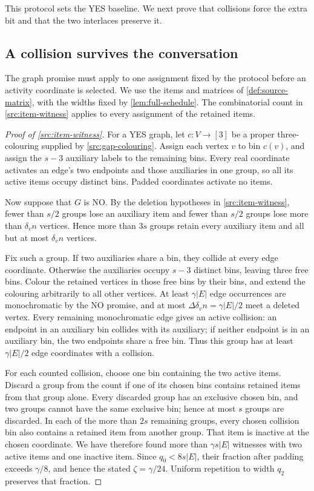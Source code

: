 \documentclass[11pt]{article} \usepackage[utf8]{inputenc}
\theoremstyle{plain} \newtheorem{theorem}{Theorem}[section]
\theoremstyle{definition} \newaliascnt{definition}{theorem}
\begin{document}
This protocol sets the YES baseline. We next prove that collisions force the
extra bit and that the two interlaces preserve it.

\subsection{A collision survives the conversation}

The graph promise must apply to one assignment fixed by the protocol before an
activity coordinate is selected. We use the items and matrices of
\cref{def:source-matrix}, with the widths fixed by \cref{lem:full-schedule}. The
combinatorial count in \cref{src:item-witness} applies to every assignment of
the retained items.

\begin{proof}[Proof of \cref{src:item-witness}]
For a YES graph, let \(c:V\to[3]\) be a proper three-colouring supplied by
\cref{src:gap-colouring}. Assign each vertex \(v\) to bin \(c(v)\), and assign
the \(s-3\) auxiliary labels to the remaining bins. Every real coordinate
activates an edge's two endpoints and those auxiliaries in one group, so all
its active items occupy distinct bins. Padded coordinates activate no items.

Now suppose that \(G\) is NO. By the deletion hypotheses in
\cref{src:item-witness}, fewer than \(s/2\) groups lose an auxiliary item and
fewer than \(s/2\) groups lose more than \(\delta_v n\) vertices. Hence more
than \(3s\) groups retain every auxiliary item and all but at most \(\delta_v
n\) vertices.

Fix such a group. If two auxiliaries share a bin, they collide at every
edge coordinate. Otherwise the auxiliaries occupy \(s-3\) distinct bins,
leaving three free bins. Colour the retained vertices in those free bins by
their bins, and extend the colouring arbitrarily to all other vertices.
At least \(\gamma|E|\) edge occurrences are monochromatic by the NO promise,
and at most \(\Delta\delta_v n=\gamma|E|/2\) meet a deleted vertex.
Every remaining monochromatic edge gives an active collision: an endpoint
in an auxiliary bin collides with its auxiliary; if neither endpoint is in
an auxiliary bin, the two endpoints share a free bin. Thus this group has
at least \(\gamma|E|/2\) edge coordinates with a collision.

For each counted collision, choose one bin containing the two active items.
Discard a group from the count if one of its chosen bins contains retained
items from that group alone. Every discarded group has an exclusive chosen bin, and two groups
cannot have the same exclusive bin; hence at most \(s\) groups are discarded.
In each of the more than \(2s\) remaining groups, every chosen collision
bin also contains a retained item from another group. That item is inactive
at the chosen coordinate. We have therefore found more than
\(\gamma s|E|\) witnesses with two active items and one inactive item.
Since \(q_0<8s|E|\), their fraction after padding exceeds
\(\gamma/8\), and hence the stated \(\zeta=\gamma/24\).
Uniform repetition to width \(q_2\) preserves that fraction.
\end{proof}
\end{document}

